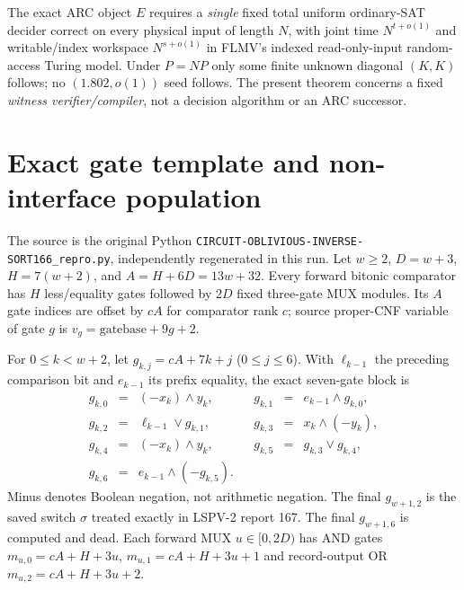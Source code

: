 \documentclass[11pt]{article}
\begin{document}
The exact ARC object $E$ requires a \emph{single} fixed total uniform ordinary-SAT decider correct on every physical input of length $N$, with joint time $N^{t+o(1)}$ and writable/index workspace $N^{s+o(1)}$ in FLMV's indexed read-only-input random-access Turing model. Under $P=NP$ only some finite unknown diagonal $(K,K)$ follows; no $(1.802,o(1))$ seed follows. The present theorem concerns a fixed \emph{witness verifier/compiler}, not a decision algorithm or an ARC successor.

\section{Exact gate template and non-interface population}
The source is the original Python \texttt{CIRCUIT-OBLIVIOUS-INVERSE-SORT166\_repro.py}, independently regenerated in this run. Let $w\ge2$, $D=w+3$, $H=7(w+2)$, and $A=H+6D=13w+32$. Every forward bitonic comparator has $H$ less/equality gates followed by $2D$ fixed three-gate MUX modules. Its $A$ gate indices are offset by $cA$ for comparator rank $c$; source proper-CNF variable of gate $g$ is $v_g=\mathrm{gatebase}+9g+2$.

For $0\le k<w+2$, let $g_{k,j}=cA+7k+j$ ($0\le j\le6$). With $\ell_{k-1}$ the preceding comparison bit and $e_{k-1}$ its prefix equality, the exact seven-gate block is
\[
\begin{array}{rclcrcl}
g_{k,0}&=&(-x_k)\land y_k,&&g_{k,1}&=&e_{k-1}\land g_{k,0},\\
g_{k,2}&=&\ell_{k-1}\lor g_{k,1},&&g_{k,3}&=&x_k\land(-y_k),\\
g_{k,4}&=&(-x_k)\land y_k,&&g_{k,5}&=&g_{k,3}\lor g_{k,4},\\
g_{k,6}&=&e_{k-1}\land(-g_{k,5}).&&&&
\end{array}\tag{1}
\]
Minus denotes Boolean negation, not arithmetic negation. The final $g_{w+1,2}$ is the saved switch $\sigma$ treated exactly in LSPV-2 report 167. The final $g_{w+1,6}$ is computed and dead. Each forward MUX $u\in[0,2D)$ has AND gates $m_{u,0}=cA+H+3u$, $m_{u,1}=cA+H+3u+1$ and record-output OR $m_{u,2}=cA+H+3u+2$.
\end{document}
